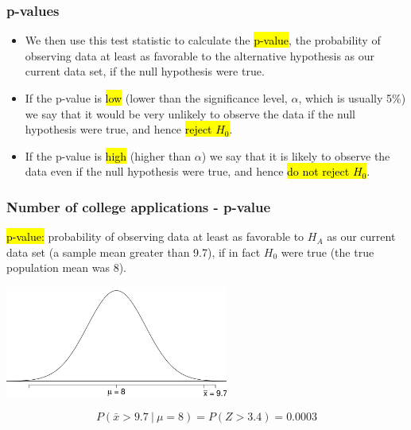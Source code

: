 \begin{frame}
\frametitle{p-values}

\begin{itemize}

\item We then use this test statistic to calculate the \hl{p-value}, the probability of observing data at least as favorable to the alternative hypothesis as our current data set, if the null hypothesis were true.

\pause

\item If the p-value is \hl{low} (lower than the significance level, $\alpha$, which is usually 5\%) we say that it would be very unlikely to observe the data if the null hypothesis were true, and hence \hl{reject $H_0$}.

\pause

\item If the p-value is \hl{high} (higher than $\alpha$) we say that it is likely to observe the data even if the null hypothesis were true, and hence \hl{do not reject $H_0$}.

\end{itemize}

\end{frame}


\begin{frame}
\frametitle{Number of college applications - p-value}

\hl{p-value:} probability of observing data at least as favorable to $H_A$ as our current data set (a sample mean greater than 9.7), if in fact $H_0$ were true (the true population mean was 8).

\begin{center}
\includegraphics[width=0.55\textwidth]{5-3_hyp_test/figures/app/app_pval_gr}
\end{center}

\pause

\[ P(\bar{x} > 9.7~|~\mu = 8) = P(Z > 3.4) = 0.0003 \]

\end{frame}

